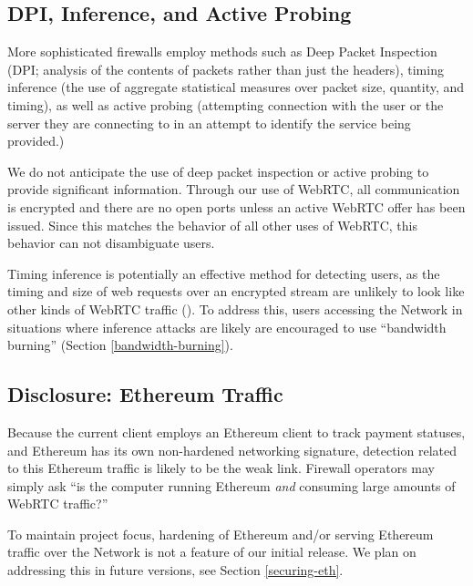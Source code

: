 \subsection{DPI, Inference, and Active Probing}

More sophisticated firewalls employ methods such as Deep Packet
Inspection (DPI; analysis of the contents of packets rather than just
the headers), timing inference (the use of aggregate statistical
measures over packet size, quantity, and timing), as well as active
probing (attempting connection with the user or the server they are
connecting to in an attempt to identify the service being provided.)

We do not anticipate the use of deep packet inspection or active
probing to provide significant information. Through our use of WebRTC,
all communication is encrypted and there are no open ports unless an
active WebRTC offer has been issued. Since this matches the behavior
of all other uses of WebRTC, this behavior can not disambiguate \Orchid{}
users.

Timing inference is potentially an effective method for detecting
\Orchid{} users, as the timing and size of web requests over an encrypted
stream are unlikely to look like other kinds of WebRTC traffic
(\cite{peekaboo}). To address this, users accessing the \Orchid{} Network
in situations where inference attacks are likely are encouraged to use
``bandwidth burning'' (Section \ref{bandwidth-burning}).

\subsection{Disclosure: Ethereum Traffic}

Because the current client employs an Ethereum client to track payment
statuses, and Ethereum has its own non-hardened networking signature,
detection related to this Ethereum traffic is likely to be the weak
link. Firewall operators may simply ask ``is the computer running
Ethereum \emph{and} consuming large amounts of WebRTC traffic?''

To maintain project focus, hardening of Ethereum and/or serving
Ethereum traffic over the \Orchid{} Network is not a feature of our
initial release. We plan on addressing this in future versions, see
Section \ref{securing-eth}.
